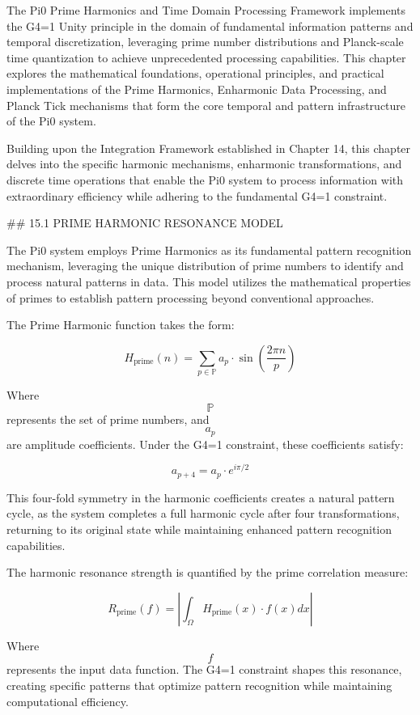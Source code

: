 The Pi0 Prime Harmonics and Time Domain Processing Framework implements the G4=1 Unity principle in the domain of fundamental information patterns and temporal discretization, leveraging prime number distributions and Planck-scale time quantization to achieve unprecedented processing capabilities. This chapter explores the mathematical foundations, operational principles, and practical implementations of the Prime Harmonics, Enharmonic Data Processing, and Planck Tick mechanisms that form the core temporal and pattern infrastructure of the Pi0 system.

Building upon the Integration Framework established in Chapter 14, this chapter delves into the specific harmonic mechanisms, enharmonic transformations, and discrete time operations that enable the Pi0 system to process information with extraordinary efficiency while adhering to the fundamental G4=1 constraint.

## 15.1 PRIME HARMONIC RESONANCE MODEL

The Pi0 system employs Prime Harmonics as its fundamental pattern recognition mechanism, leveraging the unique distribution of prime numbers to identify and process natural patterns in data. This model utilizes the mathematical properties of primes to establish pattern processing beyond conventional approaches.

The Prime Harmonic function takes the form:

$$ H_{\text{prime}}(n) = \sum_{p \in \mathbb{P}} a_p \cdot \sin\left(\frac{2\pi n}{p}\right) $$

Where $$ \mathbb{P} $$ represents the set of prime numbers, and $$ a_p $$ are amplitude coefficients. Under the G4=1 constraint, these coefficients satisfy:

$$ a_{p+4} = a_p \cdot e^{i\pi/2} $$

This four-fold symmetry in the harmonic coefficients creates a natural pattern cycle, as the system completes a full harmonic cycle after four transformations, returning to its original state while maintaining enhanced pattern recognition capabilities.

The harmonic resonance strength is quantified by the prime correlation measure:

$$ R_{\text{prime}}(f) = \left|\int_{\Omega} H_{\text{prime}}(x) \cdot f(x) dx\right| $$

Where $$ f $$ represents the input data function. The G4=1 constraint shapes this resonance, creating specific patterns that optimize pattern recognition while maintaining computational efficiency.

